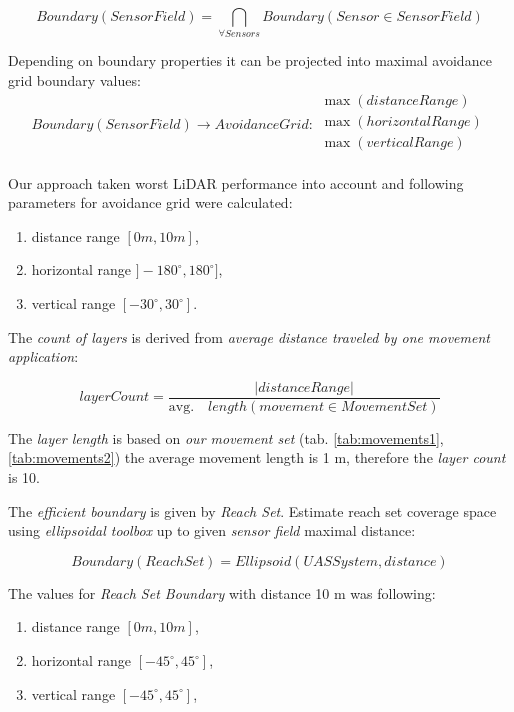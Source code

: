 \begin{equation}
     Boundary(Sensor Field) = \bigcap_{\forall Sensors} Boundary(Sensor \in Sensor Field)
\end{equation}

\noindent Depending on boundary properties it can be projected into maximal avoidance grid boundary values:
\begin{equation}
    Boundary(Sensor Field) \to Avoidance Grid : 
    \begin{gathered}
        \max(distanceRange)\\
        \max(horizontalRange)\\
        \max(verticalRange)\\
    \end{gathered}
\end{equation}

\noindent Our approach taken worst LiDAR performance into account \cite{sabatini2014lidar} and following parameters for avoidance grid were calculated:

\begin{enumerate}
    \item distance range $[0m,10m]$,
    \item horizontal range $]-180^\circ,180^\circ]$,
    \item vertical range $[-30^\circ,30^\circ]$.
\end{enumerate}

\noindent The \emph{count of layers} is derived from \emph{average distance traveled by one movement application}:

\begin{equation}
    layer Count = \frac{|distance Range|}{\text{avg.}\quad length(movement\in Movement Set)}
\end{equation}

\noindent The \emph{layer length} is based on \emph{our movement set} (tab. \ref{tab:movements1}, \ref{tab:movements2}) the average movement length is 1 m, therefore the \emph{layer count} is 10.

The \emph{efficient boundary} is given by  \emph{Reach Set}. Estimate reach set coverage space using \emph{ellipsoidal toolbox} \cite{kurzhanskiy2006ellipsoidal} up to given \emph{sensor field} maximal distance:

\begin{equation}
    Boundary(Reach Set) = Ellipsoid(UAS System,distance)
\end{equation}

The values for \emph{Reach Set Boundary} with distance 10 m was following:
\begin{enumerate}
    \item distance range $[0m,10m]$,
    \item horizontal range $[-45^\circ,45^\circ]$,
    \item vertical range $[-45^\circ,45^\circ]$,
\end{enumerate}

